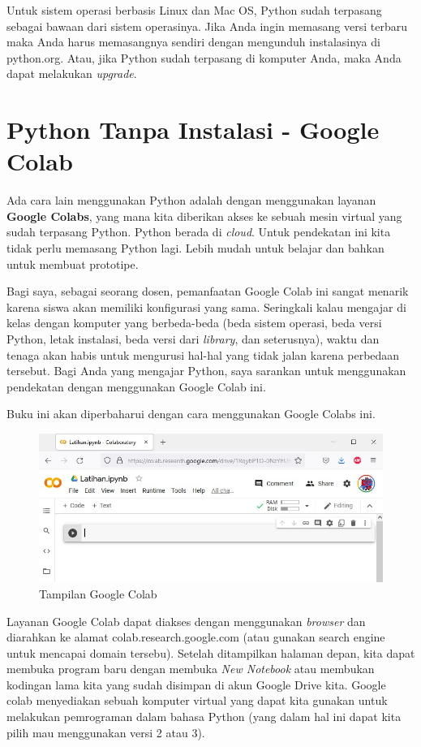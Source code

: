 Untuk sistem operasi berbasis Linux dan Mac OS, Python sudah terpasang sebagai
bawaan dari sistem operasinya. Jika Anda ingin memasang versi terbaru maka
Anda harus memasangnya sendiri dengan mengunduh instalasinya di python.org.
Atau, jika Python sudah terpasang di komputer Anda, maka Anda dapat melakukan
{\em upgrade}.

\section{Python Tanpa Instalasi - Google Colab}

Ada cara lain menggunakan Python adalah dengan menggunakan layanan
{\bf Google Colabs}, yang mana kita diberikan akses ke sebuah mesin virtual
yang sudah terpasang Python. Python berada di {\em cloud}.
Untuk pendekatan ini kita tidak perlu memasang Python lagi. 
Lebih mudah untuk belajar dan bahkan untuk membuat prototipe.

Bagi saya, sebagai seorang dosen, pemanfaatan Google Colab ini
sangat menarik karena siswa akan memiliki konfigurasi yang sama.
Seringkali kalau mengajar di kelas dengan komputer yang berbeda-beda 
(beda sistem operasi, beda versi Python, letak instalasi, beda versi
dari {\em library}, dan seterusnya), waktu dan tenaga akan habis untuk 
mengurusi hal-hal yang tidak jalan karena perbedaan tersebut.
Bagi Anda yang mengajar Python, saya sarankan untuk menggunakan
pendekatan dengan menggunakan Google Colab ini.

Buku ini akan diperbaharui dengan cara menggunakan Google Colabs ini.

\begin{figure}
\includegraphics[width=1.0\linewidth]{graphics/google-colab.jpg}
\caption{Tampilan Google Colab}
\end{figure}

Layanan Google Colab dapat diakses dengan menggunakan {\em browser} dan
diarahkan ke alamat colab.research.google.com (atau gunakan search engine
untuk mencapai domain tersebu).
Setelah ditampilkan halaman depan, kita dapat membuka program baru dengan
membuka {\em New Notebook} atau membukan kodingan lama kita yang sudah
disimpan di akun Google Drive kita.
Google colab menyediakan sebuah komputer virtual yang dapat kita gunakan
untuk melakukan pemrograman dalam bahasa Python (yang dalam hal ini dapat
kita pilih mau menggunakan versi 2 atau 3).

